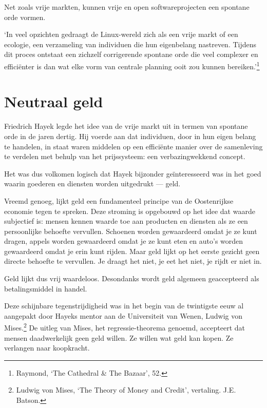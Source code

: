 \documentclass[
  a5paper,
  smalldemyvopaper,11pt,twoside,onecolumn,openright,extrafontsizes]{memoir}
\begin{document}
Net zoals vrije markten, kunnen vrije en open softwareprojecten een
spontane orde vormen.

`In veel opzichten gedraagt de Linux-wereld zich als een vrije markt of
een ecologie, een verzameling van individuen die hun eigenbelang
nastreven. Tijdens dit proces ontstaat een zichzelf corrigerende
spontane orde die veel complexer en efficiënter is dan wat elke vorm van
centrale planning ooit zou kunnen bereiken.'\footnote{\hspace{0pt}Raymond,
  `The Cathedral \& The Bazaar', 52.}

\chapter{Neutraal geld}\label{neutraal-geld}

Friedrich Hayek legde het idee van de vrije markt uit in termen van
spontane orde in de jaren dertig. Hij voerde aan dat individuen, door in
hun eigen belang te handelen, in staat waren middelen op een efficiënte
manier over de samenleving te verdelen met behulp van het prijssysteem:
een verbazingwekkend concept.

Het was dus volkomen logisch dat Hayek bijzonder geïnteresseerd was in
het goed waarin goederen en diensten worden uitgedrukt --- geld.

Vreemd genoeg, lijkt geld een fundamenteel principe van de Oostenrijkse
economie tegen te spreken. Deze stroming is opgebouwd op het idee dat
waarde subjectief is: mensen kennen waarde toe aan producten en diensten
als ze een persoonlijke behoefte vervullen. Schoenen worden gewaardeerd
omdat je ze kunt dragen, appels worden gewaardeerd omdat je ze kunt eten
en auto's worden gewaardeerd omdat je erin kunt rijden. Maar geld lijkt
op het eerste gezicht geen directe behoefte te vervullen. Je draagt het
niet, je eet het niet, je rijdt er niet in.

Geld lijkt dus vrij waardeloos. Desondanks wordt geld algemeen
geaccepteerd als betalingsmiddel in handel.

Deze schijnbare tegenstrijdigheid was in het begin van de twintigste
eeuw al aangepakt door Hayeks mentor aan de Universiteit van Wenen,
Ludwig von Mises.\footnote{\hspace{0pt}Ludwig von Mises, `The Theory of
  Money and Credit', vertaling. J.E. Batson.} De uitleg van Mises, het
regressie-theorema genoemd, accepteert dat mensen daadwerkelijk geen
geld willen. Ze willen wat geld kan kopen. Ze verlangen naar koopkracht.
\end{document}
